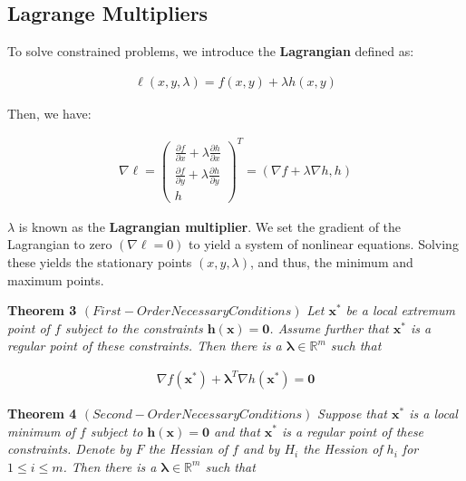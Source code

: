 \documentclass[11pt]{article}
\begin{document}
\subsection{Lagrange Multipliers}
\label{sec:org2b0d2b5}
To solve constrained problems, we introduce the \textbf{Lagrangian} defined as:

\begin{align*}
    \ell\left(x,y,\lambda\right) = f\left(x,y\right) + \lambda h\left(x,y\right)
\end{align*}

Then, we have:

\begin{align*}
    \nabla \ell = \begin{pmatrix} \frac{\partial f}{\partial x} + \lambda\frac{\partial h}{\partial x} \\ \frac{\partial f}{\partial y} + \lambda\frac{\partial h}{\partial y} \\ h \end{pmatrix}^{T} = \left(\nabla f + \lambda\nabla h, h\right)
\end{align*}

\(\lambda\) is known as the \textbf{Lagrangian multiplier}. We set the gradient of the Lagrangian to zero \(\left(\nabla \ell = 0\right)\) to yield a system of nonlinear equations. Solving these yields the stationary points \(\left(x,y,\lambda\right)\), and thus, the minimum and maximum points.

\textbf{Theorem 3 \(\left(First-Order Necessary Conditions\right)\)} \emph{Let \(\boldsymbol{x}^{*}\) be a local extremum point of \(f\) subject to the constraints \(\boldsymbol{h}\left(\boldsymbol{x}\right) = \boldsymbol{0}\). Assume further that \(\boldsymbol{x}^{*}\) is a regular point of these constraints. Then there is a \(\boldsymbol{\lambda} \in \mathbb{R}^{m}\) such that}

\begin{align*}
    \nabla f\left(\boldsymbol{x}^{*}\right) + \boldsymbol{\lambda}^{T}\nabla h\left(\boldsymbol{x}^{*}\right) = \boldsymbol{0}
\end{align*}

\textbf{Theorem 4 \(\left(Second-Order Necessary Conditions\right)\)} \emph{Suppose that \(\boldsymbol{x}^{*}\) is a local minimum of \(f\) subject to \(\boldsymbol{h}\left(\boldsymbol{x}\right) = \boldsymbol{0}\) and that \(\boldsymbol{x}^{*}\) is a regular point of these constraints. Denote by \(F\) the Hessian of \(f\) and by \(H_{i}\) the Hession of \(h_{i}\) for \(1 \leq i \leq m\). Then there is a \(\boldsymbol{\lambda} \in \mathbb{R}^{m}\) such that}
\end{document}
